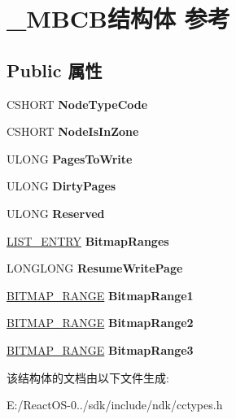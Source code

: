 \hypertarget{struct___m_b_c_b}{}\section{\+\_\+\+M\+B\+C\+B结构体 参考}
\label{struct___m_b_c_b}
\subsection*{Public 属性}
\begin{DoxyCompactItemize}
\item 
\mbox{\label{struct___m_b_c_b_a04dd3d364138ffb8819bec8a6aeda88c}} 
C\+S\+H\+O\+RT {\bfseries Node\+Type\+Code}
\item 
\mbox{\label{struct___m_b_c_b_a54577ded030b7beea679d90e94113ceb}} 
C\+S\+H\+O\+RT {\bfseries Node\+Is\+In\+Zone}
\item 
\mbox{\label{struct___m_b_c_b_a8f7bbf7fea5b71aa98a754205ac00662}} 
U\+L\+O\+NG {\bfseries Pages\+To\+Write}
\item 
\mbox{\label{struct___m_b_c_b_a9ab05c26ed92b554fe48a4384c25f83f}} 
U\+L\+O\+NG {\bfseries Dirty\+Pages}
\item 
\mbox{\label{struct___m_b_c_b_ad76dc1b9cd571ca4740d7b68f6178f27}} 
U\+L\+O\+NG {\bfseries Reserved}
\item 
\mbox{\label{struct___m_b_c_b_a0e004f3719c745fe457de48176dbdfde}} 
\hyperlink{struct___l_i_s_t___e_n_t_r_y}{L\+I\+S\+T\+\_\+\+E\+N\+T\+RY} {\bfseries Bitmap\+Ranges}
\item 
\mbox{\label{struct___m_b_c_b_a5c0e1d3e19c8c1e4e2e7fc5d4e6b3f24}} 
L\+O\+N\+G\+L\+O\+NG {\bfseries Resume\+Write\+Page}
\item 
\mbox{\label{struct___m_b_c_b_a61fd7d9395002ed5cb13e4ceb845d6fa}} 
\hyperlink{struct___b_i_t_m_a_p___r_a_n_g_e}{B\+I\+T\+M\+A\+P\+\_\+\+R\+A\+N\+GE} {\bfseries Bitmap\+Range1}
\item 
\mbox{\label{struct___m_b_c_b_aeb7603a98be8a8f36a522504504c5a47}} 
\hyperlink{struct___b_i_t_m_a_p___r_a_n_g_e}{B\+I\+T\+M\+A\+P\+\_\+\+R\+A\+N\+GE} {\bfseries Bitmap\+Range2}
\item 
\mbox{\label{struct___m_b_c_b_a09a7981907f67b2907942bc70fcbef33}} 
\hyperlink{struct___b_i_t_m_a_p___r_a_n_g_e}{B\+I\+T\+M\+A\+P\+\_\+\+R\+A\+N\+GE} {\bfseries Bitmap\+Range3}
\end{DoxyCompactItemize}


该结构体的文档由以下文件生成\+:\begin{DoxyCompactItemize}
\item 
E\+:/\+React\+O\+S-\/0../sdk/include/ndk/cctypes.\+h\end{DoxyCompactItemize}
